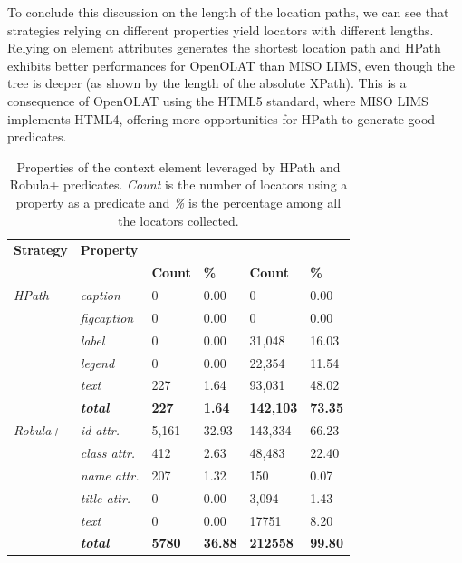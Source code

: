To conclude this discussion on the length of the location paths, we can see that strategies relying on different properties yield locators with different lengths. Relying on element attributes generates the shortest location path and HPath exhibits better performances for OpenOLAT than MISO LIMS, even though the tree is deeper (as shown by the length of the absolute XPath). This is a consequence of OpenOLAT using the HTML5 standard, where MISO LIMS implements HTML4, offering more opportunities for HPath to generate good predicates.

\begin{table}
\centering
\caption{Properties of the context element leveraged by HPath and Robula+ predicates. \emph{Count} is the number of locators using a property as a predicate and \emph{\%} is the percentage among all the locators collected.}
\label{tab:hpath-results-properties}
\begin{tabular}{>{\raggedright}m{0.4in}>{\raggedright}m{0.5in}>{\raggedleft}m{0.4in} >{\raggedleft}m{0.4in}>{\raggedleft}m{0.5in} >{\raggedleft}m{0.4in}}
\toprule
\textbf{\scriptsize{Strategy}} & \textbf{\scriptsize{Property}} & \multicolumn{2}{c}{\textbf{\scriptsize{MISO LIMS}}} & \multicolumn{2}{c}{\textbf{\scriptsize{OpenOLAT}}}\tabularnewline
&   & \textbf{\scriptsize{Count}} & \textbf{\scriptsize{\%}} & \textbf{\scriptsize{Count}} & \textbf{\scriptsize{\%}}\tabularnewline
\toprule
\scriptsize{\textit{HPath}} & \scriptsize{\textit{caption}} & \scriptsize{0} & \scriptsize{0.00} & \scriptsize{0} & \scriptsize{0.00}\tabularnewline
& \scriptsize{\textit{figcaption}} & \scriptsize{0} & \scriptsize{0.00} & \scriptsize{0} & \scriptsize{0.00}\tabularnewline
& \scriptsize{\textit{label}} & \scriptsize{0} & \scriptsize{0.00} & \scriptsize{31,048} & \scriptsize{16.03}\tabularnewline
& \scriptsize{\textit{legend}} & \scriptsize{0} & \scriptsize{0.00} & \scriptsize{22,354} & \scriptsize{11.54}\tabularnewline
& \scriptsize{\textit{text}} & \scriptsize{227} & \scriptsize{1.64} & \scriptsize{93,031} & \scriptsize{48.02}\tabularnewline
& \scriptsize{\textit{\textbf{total}}} & \scriptsize{\textbf{227}} & \scriptsize{\textbf{1.64}} & \scriptsize{\textbf{142,103}} & \scriptsize{\textbf{73.35}}\tabularnewline
\hline
\scriptsize{\textit{Robula+}} & \scriptsize{\textit{id attr.}} & \scriptsize{5,161} & \scriptsize{32.93} & \scriptsize{143,334} & \scriptsize{66.23}\tabularnewline
& \scriptsize{\textit{class attr.}} & \scriptsize{412} & \scriptsize{2.63} & \scriptsize{48,483} & \scriptsize{22.40}\tabularnewline
& \scriptsize{\textit{name attr.}} & \scriptsize{207} & \scriptsize{1.32} & \scriptsize{150} & \scriptsize{0.07}\tabularnewline
& \scriptsize{\textit{title attr.}} & \scriptsize{0} & \scriptsize{0.00} & \scriptsize{3,094} & \scriptsize{1.43}\tabularnewline
& \scriptsize{\textit{text}} & \scriptsize{0} & \scriptsize{0.00} & \scriptsize{17751} & \scriptsize{8.20}\tabularnewline
& \scriptsize{\textit{\textbf{total}}} & \scriptsize{\textbf{5780}} & \scriptsize{\textbf{36.88}} & \scriptsize{\textbf{212558}} & \scriptsize{\textbf{99.80}}\tabularnewline
\bottomrule
\end{tabular}
\end{table}

